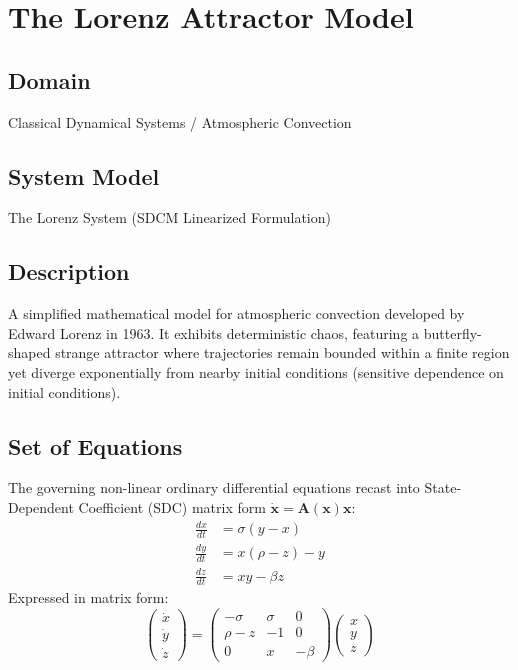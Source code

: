 \chapter{The Lorenz Attractor Model}

\section{Domain}
Classical Dynamical Systems / Atmospheric Convection

\section{System Model}
The Lorenz System (SDCM Linearized Formulation)

\section{Description}
A simplified mathematical model for atmospheric convection developed by Edward Lorenz in 1963. It exhibits deterministic chaos, featuring a butterfly-shaped strange attractor where trajectories remain bounded within a finite region yet diverge exponentially from nearby initial conditions (sensitive dependence on initial conditions).

\section{Set of Equations}
The governing non-linear ordinary differential equations recast into State-Dependent Coefficient (SDC) matrix form $\dot{\mathbf{x}} = \mathbf{A}(\mathbf{x})\mathbf{x}$:
\begin{align}
	\frac{dx}{dt} &= \sigma (y - x) \\
	\frac{dy}{dt} &= x(\rho - z) - y \\
	\frac{dz}{dt} &= xy - \beta z
\end{align}
Expressed in matrix form:
\begin{equation}
	\begin{pmatrix} \dot{x} \\ \dot{y} \\ \dot{z} \end{pmatrix} = \begin{pmatrix} -\sigma & \sigma & 0 \\ \rho - z & -1 & 0 \\ 0 & x & -\beta \end{pmatrix} \begin{pmatrix} x \\ y \\ z \end{pmatrix}
\end{equation}


